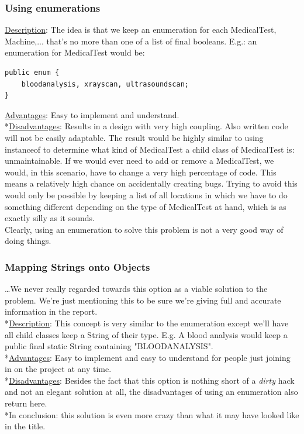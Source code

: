 \documentclass[11pt]{article}
\begin{document}
\subsubsection{Using enumerations}
\underline{Description}: The idea is that we keep an enumeration for each MedicalTest, Machine,... that's no more than one of a list of final booleans. E.g.: an enumeration for MedicalTest would be:
\begin{lstlisting}
public enum {
	bloodanalysis, xrayscan, ultrasoundscan;
}
\end{lstlisting}
\underline{Advantages}: Easy to implement and understand.
\\*\underline{Disadvantages}: Results in a design with very high coupling. Also written code will not be easily adaptable. The result would be highly similar to using instanceof to determine what kind of MedicalTest a child class of MedicalTest is: unmaintainable. If we would ever need to add or remove a MedicalTest, we would, in this scenario, have to change a very high percentage of code. This means a relatively high chance on accidentally creating bugs. Trying to avoid this would only be possible by keeping a list of all locations in which we have to do something different depending on the type of MedicalTest at hand, which is as exactly silly as it sounds.
\\Clearly, using an enumeration to solve this problem is not a very good way of doing things.

\subsubsection{Mapping Strings onto Objects}
\dots We never really regarded towards this option as a viable solution to the problem. We're just mentioning this to be sure we're giving full and accurate information in the report.
\\*\underline{Description}: This concept is very similar to the enumeration except we'll have all child classes keep a String of their type. E.g. A blood analysis would keep a public final static String containing "BLOODANALYSIS".
\\*\underline{Advantages}: Easy to implement and easy to understand for people just joining in on the project at any time.
\\*\underline{Disadvantages}: Besides the fact that this option is nothing short of a \emph{dirty} hack and not an elegant solution at all, the disadvantages of using an enumeration also return here.
\\*In conclusion: this solution is even more crazy than what it may have looked like in the title.
\end{document}
